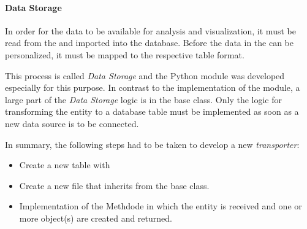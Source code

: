 \paragraph{Data Storage}
\label{par:storage}
In order for the data to be available for analysis and visualization, it must be read from the \gds{} and imported into the \pg{} database.
Before the data in the \pg{} can be personalized, it must be mapped to the respective table format.

This process is called \textit{Data Storage} and the Python module  was developed especially for this purpose.
In contrast to the implementation of the  module, a large part of the \textit{Data Storage} logic is in the base class.
Only the logic for transforming the \gds{} entity to a \pg{} database table must be implemented as soon as a new
data source is to be connected.

In summary, the following steps had to be taken to develop a new \textit{transporter}:
\begin{itemize}
  \item Create a new \pg{} table with 
  \item  Create a new  file that inherits from the base class.
  \item Implementation of the  Methdode in which the \gds{} entity is received and one or more  object(s) are created and returned.
\end{itemize}
